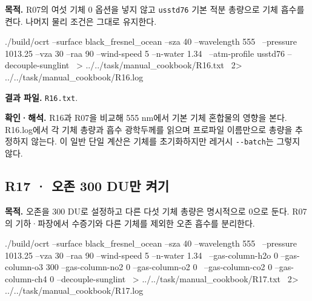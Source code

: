 \label{recipe:R16}

\textbf{목적. }R07의 여섯 기체 0 옵션을 넣지 않고 \texttt{usstd76} 기본 적분 총량으로 기체 흡수를 켠다. 나머지 물리 조건은 그대로 유지한다.

\noindent\begin{minipage}{\linewidth}
\begin{ManualCode}

./build/ocrt --surface black_fresnel_ocean --sza 40 --wavelength 555 \
  --pressure 1013.25 --vza 30 --raa 90 --wind-speed 5 --n-water 1.34 \
  --atm-profile usstd76 --decouple-sunglint \
  > ../../task/manual_cookbook/R16.txt \
  2> ../../task/manual_cookbook/R16.log

\end{ManualCode}
\end{minipage}\par

\textbf{결과 파일. }\texttt{R16.txt}.

\textbf{확인·해석. }R16과 R07을 비교해 555 nm에서 기본 기체 혼합물의 영향을 본다. R16.log에서 각 기체 총량과 흡수 광학두께를 읽으며 프로파일 이름만으로 총량을 추정하지 않는다. 이 일반 단일 계산은 기체를 초기화하지만 레거시 \texttt{-\allowbreak{}-\allowbreak{}batch}는 그렇지 않다.

\Needspace{17\baselineskip}

\subsection{R17 · 오존 300 DU만 켜기}
\label{sec:auto:09_cookbook:4.2}

\label{recipe:R17}

\textbf{목적. }오존을 300 DU로 설정하고 다른 다섯 기체 총량은 명시적으로 0으로 둔다. R07의 기하·파장에서 수증기와 다른 기체를 제외한 오존 흡수를 분리한다.

\noindent\begin{minipage}{\linewidth}
\begin{ManualCode}

./build/ocrt --surface black_fresnel_ocean --sza 40 --wavelength 555 \
  --pressure 1013.25 --vza 30 --raa 90 --wind-speed 5 --n-water 1.34 \
  --gas-column-h2o 0 --gas-column-o3 300 --gas-column-no2 0 --gas-column-o2 0 \
  --gas-column-co2 0 --gas-column-ch4 0 --decouple-sunglint \
  > ../../task/manual_cookbook/R17.txt \
  2> ../../task/manual_cookbook/R17.log

\end{ManualCode}
\end{minipage}\par

